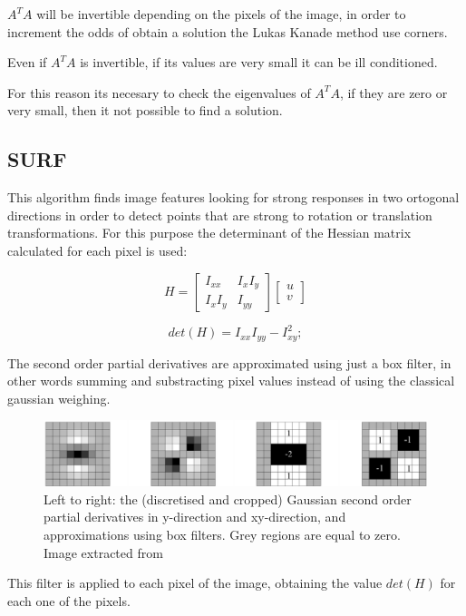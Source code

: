 $A^T A$ will be invertible depending on the pixels of the image, in order to increment the odds of obtain a solution the Lukas Kanade method use corners.

Even if $A^T A $ is invertible, if its values are very small it can be ill conditioned.

For this reason its necesary to check the eigenvalues of $A^T A$, if they are zero or very small, then it not possible to find a solution.


\subsection{SURF}

This algorithm finds image features looking for strong responses in two ortogonal directions in order to detect points that are strong to rotation or translation transformations. For this purpose the determinant of the Hessian matrix calculated for each pixel is used:


$$
H = \begin{bmatrix} I_{xx} & I_x I_y \\ I_x I_y & I_{yy} \end{bmatrix} \begin{bmatrix} u \\ v \end{bmatrix}
$$

$$
det(H) = I_{xx} I_{yy} - I_{xy}^2;
$$


The second order partial derivatives are approximated using just a box filter, in other words 
summing and substracting pixel values instead of using the classical gaussian weighing. 

\begin{figure}[!h]
\begin{center}
\includegraphics[scale=0.35]{images/surf_mask}
\caption{Left to right: the (discretised and cropped) Gaussian second order partial derivatives 
in y-direction and xy-direction, and approximations using box filters. 
Grey regions are equal to zero. Image extracted from \cite{Bay06surf}}
\end{center}
\end{figure}

This filter is applied to each pixel of the image, obtaining the value $det(H)$ for each one of the pixels. 

